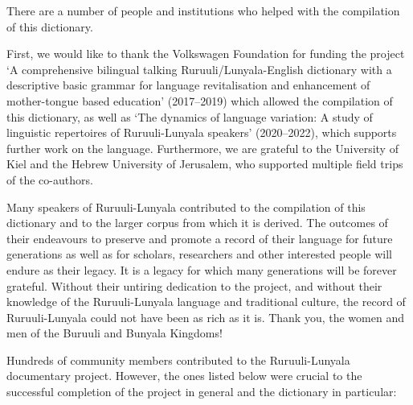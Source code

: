 \addchap{\lsAcknowledgementTitle} 

There are a number of people and institutions who helped with the compilation of this dictionary. 

First, we would like to thank the Volkswagen Foundation for funding the project ‘A comprehensive bilingual talking Ruruuli/Lu\-nya\-la-English dictionary with a descriptive basic grammar for language revitalisation and enhancement of mother-tongue based education’ (2017–2019) which allowed the compilation of this dictionary, as well as `The dynamics of language variation: A study of linguistic repertoires of Ru\-ruu\-li-Lunyala speakers' (2020–2022), which supports further work on the language. Furthermore, we are grateful to the University of Kiel and the Hebrew University of Jerusalem, who supported multiple field trips of the co-authors. 

Many speakers of Ruruuli-Lunyala contributed to the compilation of this dictionary and to the larger corpus from which it is derived. 
The outcomes of their endeavours to preserve and promote a record of their language for future generations as well as for scholars, researchers and other interested people will endure as their legacy. 
It is a legacy for which many generations will be forever grateful. 
Without their untiring dedication to the project, and without their knowledge of the Ru\-ruu\-li\hyp{}Lu\-nya\-la language and traditional culture, the record of Ru\-ruu\-li\hyp{}Lu\-nya\-la could not have been as rich as it is. 
Thank you, the women and men of the Buruuli and Bunyala Kingdoms!

Hundreds of community members contributed to the Ru\-ruu\-li\hyp{}Lu\-nya\-la documentary project. 
However, the ones listed below were crucial to the successful completion of the project in general and the dictionary in particular:

